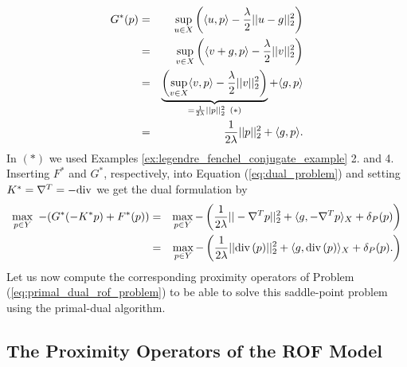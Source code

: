 \documentclass[abstracton]{scrreprt}
\begin{document}
                \begin{eqnarray}
                    G^{\ast}(p) &=& \sup_{u \in X} \left( \langle u, p \rangle - \frac{\lambda}{2} ||u - g||_{2}^{2} \right) \notag \\
                    &=& \sup_{v \in X} \left( \langle v + g, p \rangle - \frac{\lambda}{2} ||v||_{2}^{2} \right) \notag \\
                    &=& \underbrace{\left( \sup_{v \in X} \langle v, p \rangle - \frac{\lambda}{2} ||v||_{2}^{2} \right)}_{= \frac{1}{2\lambda} ||p||_{2}^{2} \,\,\, (\ast)} + \langle g, p \rangle \notag \\
                    &=& \frac{1}{2\lambda} ||p||_{2}^{2} + \langle g, p \rangle. \notag
                \end{eqnarray}
            In $(\ast)$ we used Examples \ref{ex:legendre_fenchel_conjugate_example} 2. and 4. Inserting $F^{\ast}$ and $G^{\ast}$, respectively, into Equation (\ref{eq:dual_problem}) and setting $K^{\ast} = \nabla^{T} = -\textnormal{div}$ we get the dual formulation by
                \begin{eqnarray}
                    \max_{p \in Y}\,\, -(G^{\ast}(-K^{\ast}p) + F^{\ast}(p)) &=& \max_{p \in Y} - \left( \frac{1}{2\lambda} ||-\nabla^{T}p||^{2}_{2} + \langle g, -\nabla^{T}p \rangle_{X} + \delta_{P}(p) \right) \notag \\
                    &=& \max_{p \in Y} - \left( \frac{1}{2\lambda} ||\textnormal{div}\,(p)||^{2}_{2} + \langle g, \textnormal{div}\,(p) \rangle_{X} + \delta_{P}(p). \right) \notag
                \end{eqnarray}
            Let us now compute the corresponding proximity operators of Problem (\ref{eq:primal_dual_rof_problem}) to be able to solve this saddle-point problem using the primal-dual algorithm.
        \subsection{The Proximity Operators of the ROF Model} %
        \label{sub:the_proximity_operators_for_the_rof_model}
\end{document}
